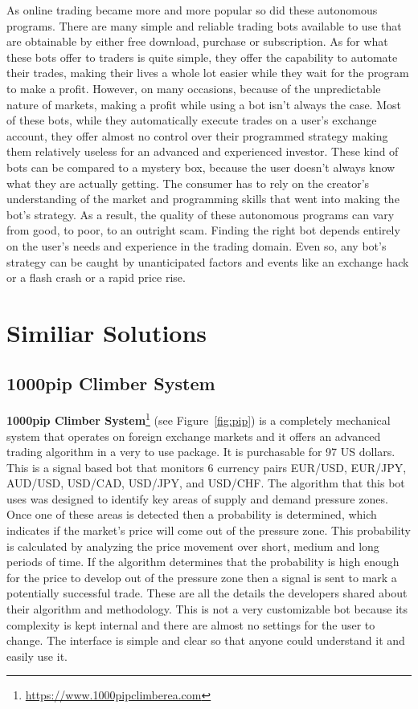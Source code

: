 \documentclass[12pt,a4paper]{report}
\begin{document}
As online trading became more and more popular so did these autonomous programs. There are many simple and reliable trading bots available to use that are obtainable by either free download, purchase or subscription. As for what these bots offer to traders is quite simple, they offer the capability to automate their trades, making their lives a whole lot easier while they wait for the program to make a profit. However, on many occasions, because of the unpredictable nature of markets, making a profit while using a bot isn't always the case. Most of these bots, while they automatically execute trades on a user's exchange account, they offer almost no control over their programmed strategy making them relatively useless for an advanced and experienced investor. These kind of bots can be compared to a mystery box, because the user doesn't always know what they are actually getting. The consumer has to rely on the creator's understanding of the market and programming skills that went into making the bot's strategy. As a result, the quality of these autonomous programs can vary from good, to poor, to an outright scam. Finding the right bot depends entirely on the user's needs and experience in the trading domain. Even so, any bot's strategy can be caught by unanticipated factors and events like an exchange hack or a flash crash or a rapid price rise.
     

\section{Similiar Solutions}
\subsection{1000pip Climber System}
\textbf{1000pip Climber System}\footnote{\url{https://www.1000pipclimberea.com}} (see Figure~\ref{fig:pip}) is a completely mechanical system that operates on foreign exchange markets and it offers an advanced trading algorithm in a very to use package. It is purchasable for 97 US dollars. This is a signal based bot that monitors 6 currency pairs EUR/USD, EUR/JPY, AUD/USD, USD/CAD, USD/JPY, and USD/CHF. The algorithm that this bot uses was designed to identify key areas of supply and demand pressure zones. Once one of these areas is detected then a probability is determined, which indicates if the market's price will come out of the pressure zone. This probability is calculated by analyzing the price movement over short, medium and long periods of time. If the algorithm determines that the probability is high enough for the price to develop out of the pressure zone then a signal is sent to mark a potentially successful trade. These are all the details the developers shared about their algorithm and methodology. This is not a very customizable bot because its complexity is kept internal and there are almost no settings for the user to change. The interface is simple and clear so that anyone could understand it and easily use it.    
\end{document}
